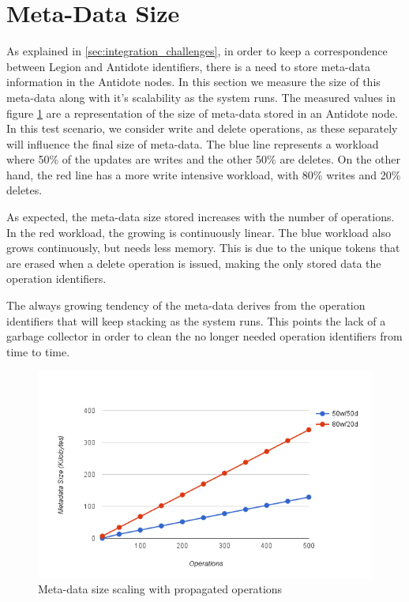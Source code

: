 \section{Meta-Data Size}
\label{sec:meta-data_size}
As explained in \ref{sec:integration_challenges}, in order to keep a correspondence between Legion and Antidote identifiers, there is a need to store meta-data information in the Antidote nodes. In this section we measure the size of this meta-data along with it's scalability as the system runs. The measured values in figure \ref{chart3} are a representation of the size of meta-data stored in an Antidote node. In this test scenario, we consider write and delete operations, as these separately will influence the final size of meta-data. The blue line represents a workload where 50\% of the updates are writes and the other 50\% are deletes. On the other hand, the red line has a more write intensive workload, with 80\% writes and 20\% deletes.\par
	As expected, the meta-data size stored increases with the number of operations. In the red workload, the growing is continuously linear. The blue workload also grows continuously, but needs less memory. This is due to the unique tokens that are erased when a delete operation is issued, making the only stored data the operation identifiers.\par
	The always growing tendency of the meta-data derives from the operation identifiers that will keep stacking as the system runs. This points the lack of a garbage collector in order to clean the no longer needed operation identifiers from time to time.

\begin{figure}[h]
\centering
\includegraphics[scale=0.7]{files/chart3.png}
\caption{Meta-data size scaling with propagated operations}
\label{chart3}
\end{figure}

